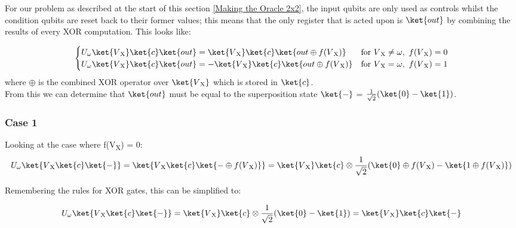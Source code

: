 \documentclass{article}
\begin{document}
For our problem as described at the start of this section \ref{Making the Oracle 2x2}, the input qubits are only used as controls whilst the condition qubits are reset back to their former values; this means that the only register that is acted upon is $\ket{out}$ by combining the results of every XOR computation. This looks like:

\begin{equation}
\begin{cases}
      U_{\omega}\ket{V\textsubscript{X}}\ket{c}\ket{out} = \ket{V\textsubscript{X}}\ket{c}\ket{out \oplus f(V\textsubscript{X})}  & \text{for} \ V\textsubscript{X} \neq \omega, \ f(V\textsubscript{X}) = 0 \\
      U_{\omega}\ket{V\textsubscript{X}}\ket{c}\ket{out} = -\ket{V\textsubscript{X}}\ket{c}\ket{out \oplus f(V\textsubscript{X})}  & \text{for} \ V\textsubscript{X} = \omega, \ f(V\textsubscript{X}) =1 \\
    
\end{cases}  
\end{equation}
where $\oplus$ is the combined XOR operator over $\ket{V\textsubscript{X}}$ which is stored in $\ket{c}$.
\\

From this we can determine that $\ket{out}$ must be equal to the superposition state $\ket{-}$ = $\frac{1}{\sqrt{2}}(\ket{0} - \ket{1})$. 
\subsubsection{Case 1}
Looking at the case where f(V\textsubscript{X}) = 0:
\\
\begin{equation}
U_\omega\ket{V\textsubscript{X}\ket{c}\ket{-}} = \ket{V\textsubscript{X}\ket{c}\ket{- \oplus f(V\textsubscript{X})}} = \ket{V\textsubscript{X}}\ket{c} \otimes \frac{1}{\sqrt{2}}(\ket{0} \oplus f(V\textsubscript{X}) - \ket{1 \oplus f(V\textsubscript{X})}) 
\end{equation}

Remembering the rules for XOR gates, this can be simplified to:

\begin{equation}
U_\omega\ket{V\textsubscript{X}\ket{c}\ket{-}} = \ket{V\textsubscript{X}}\ket{c} \otimes \frac{1}{\sqrt{2}}(\ket{0} - \ket{1}) \\
= \ket{V\textsubscript{X}}\ket{c}\ket{-}
\end{equation}
\end{document}

